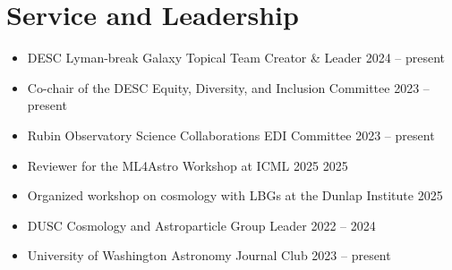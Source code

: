 \section{Service and Leadership}
\begin{itemize}
    \item DESC Lyman-break Galaxy Topical Team Creator \& Leader \hfill 2024 -- present

    \item Co-chair of the DESC Equity, Diversity, and Inclusion Committee \hfill 2023 -- present

    \item Rubin Observatory Science Collaborations EDI Committee \hfill 2023 -- present

    \item Reviewer for the ML4Astro Workshop at ICML 2025 \hfill 2025

    \item Organized workshop on cosmology with LBGs at the Dunlap Institute \hfill 2025

    \item DUSC Cosmology and Astroparticle Group Leader \hfill 2022 -- 2024

    \item University of Washington Astronomy Journal Club \hfill 2023 -- present


\end{itemize}

